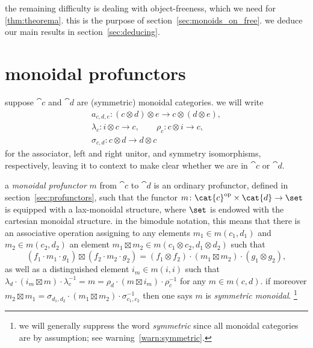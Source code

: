 \documentclass[11pt,oneside,article]{memoir}
\begin{document}
the remaining difficulty is dealing with object-freeness, which we need for \ref{thm:theorema}. this is the purpose of section~\ref{sec:monoids_on_free}. we deduce our main results in section~\ref{sec:deducing}.


\section{monoidal profunctors}\label{sec:monoidal_profunctors}

suppose $\cat{c}$ and $\cat{d}$ are (symmetric) monoidal categories. we will write
\begin{gather*}
   a_{c,d,e}\colon (c\otimes d)\otimes e \to c\otimes(d\otimes e), \\
      \lambda_c\colon i\otimes c\to c,
      \qquad \rho_c\colon c\otimes i \to c, \\
      \sigma_{c,d}\colon c\otimes d\to d\otimes c
\end{gather*}
for the associator, left and right unitor, and symmetry isomorphisms, respectively, leaving it to
context to make clear whether we are in $\cat{c}$ or $\cat{d}$.

a \emph{monoidal profunctor} $m$ from $\cat{c}$ to $\cat{d}$ is an ordinary profunctor, defined in
section~\ref{sec:profunctors}, such that the functor $m\colon \op{\cat{c}}\times\cat{d}\to\set$ is
equipped with a lax-monoidal structure, where $\set$ is endowed with the cartesian monoidal
structure. in the bimodule notation, this means that there is an associative operation assigning to
any elements $m_1\in m(c_1,d_1)$ and $m_2\in m(c_2,d_2)$ an element $m_1\boxtimes m_2\in
m(c_1\otimes c_2,d_1\otimes d_2)$ such that
\[
   (f_1\cdot m_1\cdot g_1)\boxtimes(f_2\cdot m_2\cdot g_2) = (f_1\otimes f_2)\cdot(m_1\boxtimes m_2)\cdot(g_1\otimes g_2),
\]
as well as a distinguished element $i_m\in m(i,i)$ such that $\lambda_d\cdot(i_m\boxtimes
m)\cdot\lambda^{-1}_c = m = \rho_d\cdot(m\boxtimes i_m)\cdot\rho^{-1}_c$ for any $m\in m(c,d)$. if
moreover $m_2\boxtimes m_1 = \sigma_{d_1,d_2}\cdot(m_1\boxtimes m_2)\cdot\sigma_{c_1,c_2}^{-1}$ then
one says $m$ is \emph{symmetric monoidal}.%
\footnote{we will generally suppress the word \emph{symmetric} since all monoidal categories are by
assumption; see warning~\ref{warn:symmetric}.}
\end{document}
